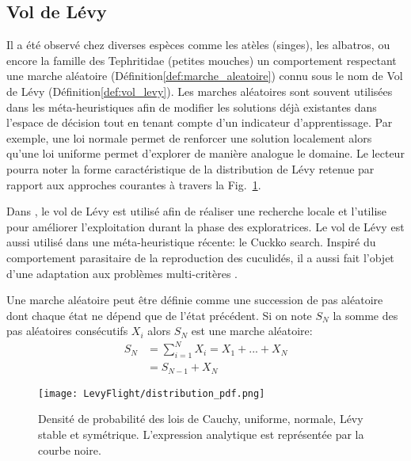 \subsection{Vol de Lévy} %
\label{sub:vol_de_levy}
Il a été observé chez diverses espèces comme les atèles (singes), les albatros,
ou encore la famille des Tephritidae (petites mouches) un comportement respectant
une marche aléatoire (Définition\ref{def:marche_aleatoire}) connu sous le nom de
Vol de Lévy (Définition\ref{def:vol_levy}).
Les marches aléatoires sont souvent utilisées dans les méta-heuristiques afin de
modifier les solutions déjà existantes dans l’espace de décision tout en tenant
compte d’un indicateur d’apprentissage. Par exemple, une loi normale permet
de renforcer une solution localement alors qu’une loi uniforme permet d’explorer
de manière analogue le domaine. Le lecteur pourra noter la forme caractéristique
de la distribution de Lévy retenue par rapport aux approches courantes à travers
la Fig.~\ref{fig:distribution_pdf}.

Dans \cite{Sharma2012213}, le vol de Lévy est utilisé afin de réaliser une recherche
locale et \cite{Hakli2013254} l’utilise pour améliorer l’exploitation durant la phase des
exploratrices. Le vol de Lévy est aussi utilisé dans une méta-heuristique récente: le
Cuckko search. Inspiré du comportement parasitaire de la reproduction des cuculidés, il a
aussi fait l’objet d’une adaptation aux problèmes multi-critères \parencite{Yang20131616}.

\begin{Def}\label{def:marche_aleatoire}
Une marche aléatoire \parencite{Yang201445} peut être définie comme une succession de pas
aléatoire dont chaque état ne dépend que de l’état précédent. Si on note $S_{N}$
la somme des pas aléatoires consécutifs $X_{i}$ alors $S_{N}$ est une marche aléatoire:
\begin{equation}\label{eq:marche_aleatoire}
    \begin{split}
        S_{N} &= \sum_{i=1}^{N} X_{i} = X_{1} + ... + X_{N}\\
              &= S_{N-1} + X_{N}
    \end{split}
\end{equation}
\end{Def}

\begin{figure}
    \begin{center}
        \texttt{[image: LevyFlight/distribution\_pdf.png]}
    \end{center}
    \caption{Densité de probabilité des lois de Cauchy, uniforme, normale, Lévy stable et symétrique.
             L’expression analytique est représentée par la courbe noire.
             \label{fig:distribution_pdf}}
\end{figure}

